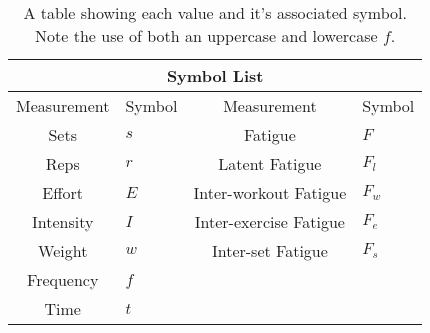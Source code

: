 \begin{table}[h]
	\centering
    \begin{tabular}{|c|l||c|l|}
	    	\hline
	    \multicolumn{4}{|c|}{Symbol List} \\
	    \hline
        Measurement & Symbol & Measurement & Symbol\\
        \hline
        Sets & $s$ & Fatigue & $F$ \\
        Reps & $r$ & Latent Fatigue & $F_l$ \\
        Effort & $E$ & Inter-workout Fatigue & $F_w$ \\
        Intensity & $I$ & Inter-exercise Fatigue & $F_e$ \\
        Weight & $w$ & Inter-set Fatigue & $F_s$ \\ 
        Frequency & $f$ & & \\
        Time & $t$ & & \\
        \hline
    \end{tabular}
    \caption{A table showing each value and it's associated symbol. Note the use of both an uppercase and lowercase $f$.}
    \label{tab:SymbolTable}
\end{table}
